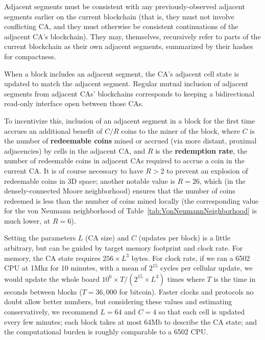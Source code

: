 \documentclass{article}
\begin{document}
Adjacent segments must be consistent with any previously-observed adjacent segments
earlier on the current blockchain (that is, they must not involve conflicting CA,
and they must otherwise be consistent continuations of the adjacent CA's blockchain).
They may, themselves, recursively refer to parts of the current blockchain as their own adjacent segments,
summarized by their hashes for compactness.

When a block includes an adjacent segment, the CA's adjacent cell state is updated to match the adjacent segment.
Regular mutual inclusion of adjacent segments from adjacent CAs' blockchains
corresponds to keeping a bidirectional read-only interface open between those CAs.

To incentivize this,
inclusion of an adjacent segment in a block for the first time
accrues an additional benefit of $C/R$ coins to the miner of the block,
where $C$ is the number of {\bf redeemable coins} mined or accrued (via more distant, proximal adjacencies)
by cells in the adjacent CA,
and $R$ is the {\bf redemption rate}, the number of redeemable coins in adjacent CAs
required to accrue a coin in the current CA.
It is of course necessary to have $R>2$ to prevent an explosion of redeemable coins in 3D space;
another notable value is $R=26$, which (in the densely-connected Moore neighborhood)
ensures that the number of coins redeemed is less than the number of coins mined locally
(the corresponding value for the von Neumann neighborhood of Table~\ref{tab:VonNeumannNeighborhood}
is much lower, at $R=6$).

Setting the parameters $L$ (CA size) and $C$ (updates per block)
is a little arbitrary, but can be guided by target memory footprint and clock rate.
For memory, the CA state requires $256 \times L^3$ bytes.
For clock rate, if we ran a 6502 CPU at 1Mhz for 10 minutes, with a mean of $2^{15}$ cycles per cellular update,
we would update the whole board $10^6 \times T / (2^{15} \times L^3)$ times
where $T$ is the time in seconds between blocks ($T=36,000$ for bitcoin).
Faster clocks and protocols no doubt allow better numbers,
but considering these values and estimating conservatively,
we recommend $L=64$ and $C=4$ so that
each cell is updated every few minutes;
each block takes at most 64Mb to describe the CA state;
and the computational burden is roughly comparable to a 6502 CPU.

\newcommand\memtable[1]{
\begin{tabular}{lll}
  \hline
  From & To & Contents \\
  \hline
  #1
  \hline
\end{tabular}
}
\end{document}
